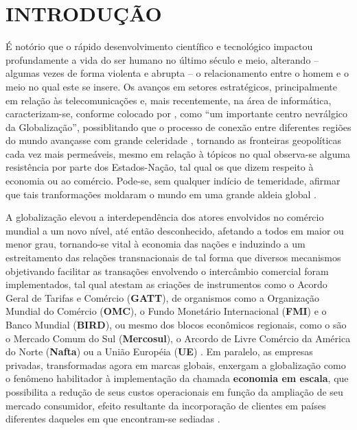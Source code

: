 
\chapter{INTRODUÇÃO}
\label{chap:introducao}



É notório que o rápido desenvolvimento científico e tecnológico impactou profundamente a vida do ser humano no último século e meio, alterando -- algumas vezes de forma violenta e abrupta -- o relacionamento entre o homem e o meio no qual este se insere. Os avanços em setores estratégicos, principalmente em relação às telecomunicações e, mais recentemente, na área de informática, caracterizam-se, conforme colocado por , como ``um importante centro nevrálgico da Globalização'', possiblitando que o processo de conexão entre diferentes regiões do mundo avançasse com grande celeridade \cite{cignacco2012comercio}, tornando as fronteiras geopolíticas cada vez mais permeáveis, mesmo em relação à tópicos no qual observa-se alguma resistência por parte dos Estados-Nação, tal qual os que dizem respeito à economia ou ao comércio. Pode-se, sem qualquer indício de temeridade, afirmar que tais tranformações moldaram o mundo em uma grande aldeia global \cite{cignacco2012comercio}.

A globalização elevou a interdependência dos atores envolvidos no comércio mundial a um novo nível, até então desconhecido, afetando a todos em maior ou menor grau, tornando-se vital à economia das nações \cite{segalis2015fundamentos} e induzindo a um estreitamento das relações transnacionais de tal forma que diversos mecanismos objetivando facilitar as transações envolvendo o intercâmbio comercial foram implementados, tal qual atestam as criações de instrumentos como o Acordo Geral de Tarifas e Comércio (\textbf{GATT}), de organismos como a Organização Mundial do Comércio (\textbf{OMC}), o Fundo Monetário Internacional (\textbf{FMI}) e o Banco Mundial (\textbf{BIRD}), ou mesmo dos blocos econômicos regionais, como o são o Mercado Comum do Sul (\textbf{Mercosul}), o Arcordo de Livre Comércio da América do Norte (\textbf{Nafta}) ou a União Européia (\textbf{UE}) \cite{cignacco2012comercio,ludovico2017logistica}. Em paralelo, as empresas privadas, transformadas agora em marcas globais, enxergam a globalização como o fenômeno habilitador à implementação da chamada \textbf{economia em escala}, que possibilita a redução de seus custos operacionais em função da ampliação de seu mercado consumidor, efeito resultante da incorporação de clientes em países diferentes daqueles em que encontram-se sediadas \cite{cignacco2012comercio}.


